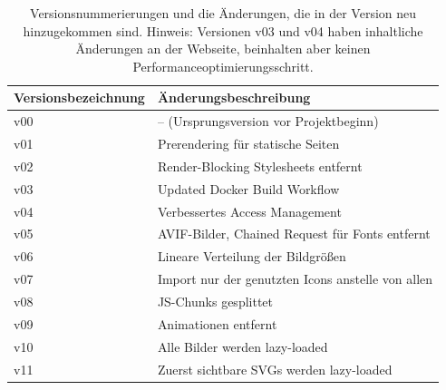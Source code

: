 \documentclass[11pt,a4paper]{article}
\begin{document}
\begin{table}[h]
  \begin{tabular}{|l|l|}
    \hline
    Versionsbezeichnung & Änderungsbeschreibung\\
    \hline
    v00 & -- (Ursprungsversion vor Projektbeginn)\\
    \hline
    v01 & Prerendering für statische Seiten\\
    \hline
    v02 & Render-Blocking Stylesheets entfernt\\
    \hline
    v03 & Updated Docker Build Workflow\\
    \hline
    v04 & Verbessertes Access Management\\
    \hline
    v05 & AVIF-Bilder, Chained Request für Fonts entfernt\\
    \hline
    v06 & Lineare Verteilung der Bildgrößen\\
    \hline
    v07 & Import nur der genutzten Icons anstelle von allen\\
    \hline
    v08 & JS-Chunks gesplittet\\
    \hline
    v09 & Animationen entfernt\\
    \hline
    v10 & Alle Bilder werden lazy-loaded\\
    \hline
    v11 & Zuerst sichtbare SVGs werden lazy-loaded\\
    \hline
  \end{tabular}
  \caption{Versionsnummerierungen und die Änderungen, die in der Version neu hinzugekommen sind. Hinweis: Versionen v03 und v04 haben inhaltliche Änderungen an der Webseite, beinhalten aber keinen Performanceoptimierungsschritt.}\label{tab:versionen}
\end{table}
\end{document}
